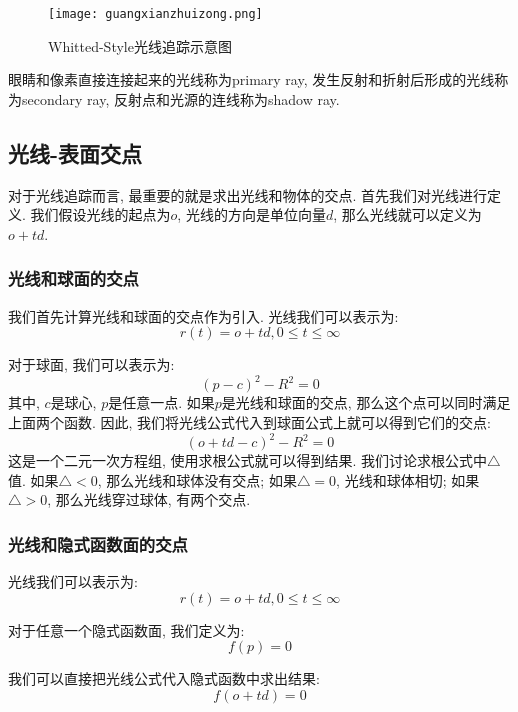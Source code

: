 \begin{figure}[H]
	\centering
	\texttt{[image: guangxianzhuizong.png]}
	\caption{Whitted-Style光线追踪示意图}
	\label{fig:gxzz}
\end{figure}
眼睛和像素直接连接起来的光线称为primary ray, 发生反射和折射后形成的光线称为secondary ray, 反射点和光源的连线称为shadow ray. 

\subsection{光线-表面交点}
对于光线追踪而言, 最重要的就是求出光线和物体的交点. 首先我们对光线进行定义. 我们假设光线的起点为$o$, 光线的方向是单位向量$d$, 那么光线就可以定义为$o+td$. 

\subsubsection{光线和球面的交点}

我们首先计算光线和球面的交点作为引入. 光线我们可以表示为: 
\begin{equation}
	r(t)=o+td, 0\le t \le \infty
\end{equation}

对于球面, 我们可以表示为: 
\begin{equation}
	(p-c)^2-R^2=0
\end{equation}其中, $c$是球心, $p$是任意一点. 如果$p$是光线和球面的交点, 那么这个点可以同时满足上面两个函数. 因此, 我们将光线公式代入到球面公式上就可以得到它们的交点: 
\begin{equation}
	(o+td-c)^2-R^2=0
\end{equation}
这是一个二元一次方程组, 使用求根公式就可以得到结果. 我们讨论求根公式中$\triangle$值. 如果$\triangle < 0$, 那么光线和球体没有交点; 如果$\triangle = 0$, 光线和球体相切; 如果$\triangle > 0$, 那么光线穿过球体, 有两个交点. 

\subsubsection{光线和隐式函数面的交点}

光线我们可以表示为: 
\begin{equation}
	r(t)=o+td, 0\le t \le \infty
\end{equation}

对于任意一个隐式函数面, 我们定义为: 
\begin{equation}
	f(p)=0
\end{equation}

我们可以直接把光线公式代入隐式函数中求出结果: 
\begin{equation}
	f(o+td)=0
\end{equation}

